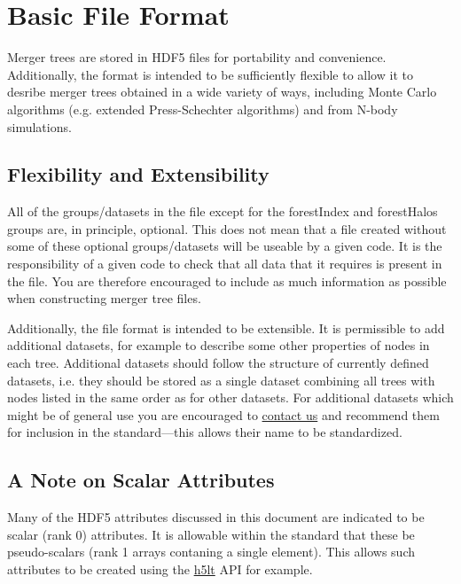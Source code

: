 \section{Basic File Format}\label{sec:MergerTreeFormatDescription}

Merger trees are stored in HDF5 files for portability and convenience. Additionally, the format is intended to be sufficiently flexible to allow it to desribe merger trees obtained in a wide variety of ways, including Monte Carlo algorithms (e.g. extended Press-Schechter algorithms) and from N-body simulations. 

\subsection{Flexibility and Extensibility}

All of the groups/datasets in the file except for the {\normalfont \ttfamily forestIndex} and {\normalfont \ttfamily forestHalos} groups are, in principle, optional. This does not mean that a file created without some of these optional groups/datasets will be useable by a given code. It is the responsibility of a given code to check that all data that it requires is present in the file. You are therefore encouraged to include as much information as possible when constructing merger tree files.

Additionally, the file format is intended to be extensible. It is permissible to add additional datasets, for example to describe some other properties of nodes in each tree. Additional datasets should follow the structure of currently defined datasets, i.e. they should be stored as a single dataset combining all trees with nodes listed in the same order as for other datasets. For additional datasets which might be of general use you are encouraged to \href{mailto:abenson@obs.carnegiescience.edu}{contact us} and recommend them for inclusion in the standard---this allows their name to be standardized.

\subsection{A Note on Scalar Attributes}

Many of the HDF5 attributes discussed in this document are indicated to be scalar (rank 0) attributes. It is allowable within the standard that these be pseudo-scalars (rank 1 arrays contaning a single element). This allows such attributes to be created using the \href{http://www.hdfgroup.org/HDF5/doc/HL/RM_H5LT.html}{\normalfont \ttfamily h5lt} API for example.

